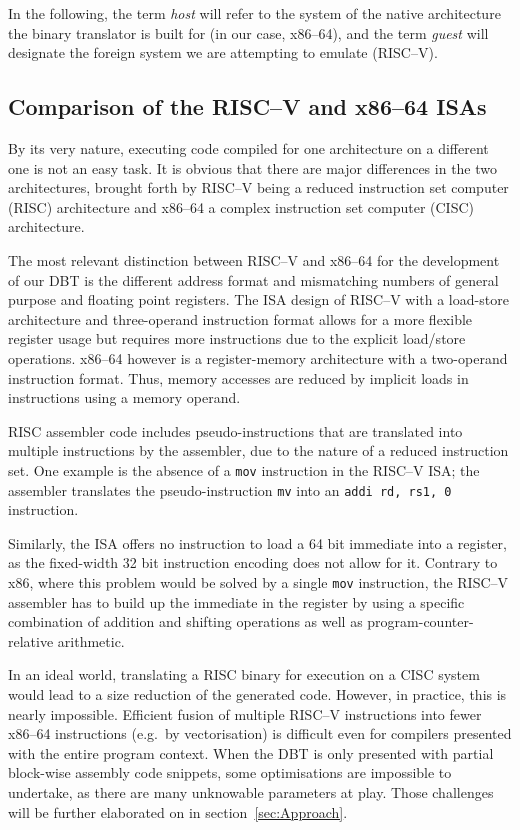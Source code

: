 In the following, the term \textit{host} will refer to the system of the native architecture the binary translator is built for (in our case, x86--64), and the term \textit{guest} will designate the foreign system we are attempting to emulate (RISC--V).

\subsection{Comparison of the RISC--V and x86--64 ISAs}
\label{sec:isa-cmp}
By its very nature, executing code compiled for one architecture on a different one is not an easy task.
It is obvious that there are major differences in the two architectures, brought forth by RISC--V being a reduced instruction set computer (RISC) architecture and x86--64 a complex instruction set computer (CISC) architecture.

The most relevant distinction between RISC--V and x86--64 for the development of our DBT is the different address format and mismatching numbers of general purpose and floating point registers.
The ISA design of RISC--V with a load-store architecture and three-operand instruction format allows for a more flexible register usage but requires more instructions due to the explicit load/store operations.
x86--64 however is a register-memory architecture with a two-operand instruction format.
Thus, memory accesses are reduced by implicit loads in instructions using a memory operand.

RISC assembler code includes pseudo-instructions that are translated into multiple instructions by the assembler, due to the nature of a reduced instruction set.
One example is the absence of a \texttt{mov} instruction in the RISC--V ISA\@; the assembler translates the pseudo-instruction \texttt{mv} into an \texttt{addi rd, rs1, 0} instruction.

Similarly, the ISA offers no instruction to load a 64 bit immediate into a register, as the fixed-width 32 bit instruction encoding does not allow for it.
Contrary to x86, where this problem would be solved by a single \texttt{mov} instruction, the RISC--V assembler has to build up the immediate in the register by using a specific combination of addition and shifting operations as well as program-counter-relative arithmetic.

In an ideal world, translating a RISC binary for execution on a CISC system would lead to a size reduction of the generated code.
However, in practice, this is nearly impossible.
Efficient fusion of multiple RISC--V instructions into fewer x86--64 instructions (e.g.\ by vectorisation) is difficult even for compilers presented with the entire program context.
When the DBT is only presented with partial block-wise assembly code snippets, some optimisations are impossible to undertake, as there are many unknowable parameters at play.
Those challenges will be further elaborated on in section~\ref{sec:Approach}.

